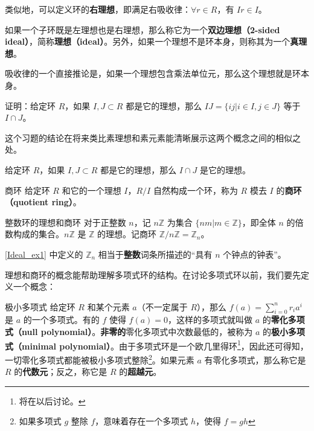 类似地，可以定义环的\textbf{右理想}，即满足右吸收律：$\forall r\in R$，有 $Ir\in I$。

如果一个子环既是左理想也是右理想，那么称它为一个\textbf{双边理想（2-sided ideal）}，简称\textbf{理想（ideal）}。另外，如果一个理想不是环本身，则称其为一个\textbf{真理想}。

吸收律的一个直接推论是，如果一个理想包含乘法单位元，那么这个理想就是环本身。

\begin{exercise}{}
证明：给定环 $R$，如果 $I, J\subset R$ 都是它的理想，那么 $IJ=\{ij|i\in I, j\in J\}$ 等于 $I\cap J$。
\end{exercise}

这个习题的结论在将来类比素理想和素元素能清晰展示这两个概念之间的相似之处。

\begin{theorem}{}
给定环 $R$，如果 $I, J\subset R$ 都是它的理想，那么 $I\cap J$ 是它的理想。
\end{theorem}


\begin{definition}{商环}
给定环 $R$ 和它的一个理想 $I$，$R/I$ 自然构成一个环，称为 $R$ 模去 $I$ 的\textbf{商环（quotient ring）}。
\end{definition}


\begin{example}{整数环的理想和商环}\label{Ideal_ex1}
对于正整数 $n$，记 $n\mathbb{Z}$ 为集合 $\{nm|m\in\mathbb{Z}\}$，即全体 $n$ 的倍数构成的集合。$n\mathbb{Z}$ 是 $\mathbb{Z}$ 的理想。记商环 $\mathbb{Z}/n\mathbb{Z}=\mathbb{Z}_n$。
\end{example}

\autoref{Ideal_ex1} 中定义的 $\mathbb{Z}_n$ 相当于\textbf{整数}词条所描述的“具有 $n$ 个钟点的钟表”。


理想和商环的概念能帮助理解多项式环的结构。在讨论多项式环以前，我们要先定义一个概念：

\begin{definition}{极小多项式}
给定环 $R$ 和某个元素 $a$（不一定属于 $R$），那么 $f(a)=\sum\limits^{n}_{i=0}r_ia^i$ 是 $a$ 的一个多项式。有的 $f$ 使得 $f(a)=0$，这样的多项式就叫做 $a$ 的\textbf{零化多项式（null polynomial）}。\textbf{非零的}零化多项式中次数最低的，被称为 $a$ 的\textbf{极小多项式（minimal polynomial）}。由于多项式环是一个欧几里得环\footnote{将在以后讨论。}，因此还可得知，一切零化多项式都能被极小多项式整除\footnote{如果多项式 $g$ 整除 $f$，意味着存在一个多项式 $h$，使得 $f=gh$}。如果元素 $a$ 有零化多项式，那么称它是 $R$ 的\textbf{代数元}；反之，称它是 $R$ 的\textbf{超越元}。
\end{definition}


